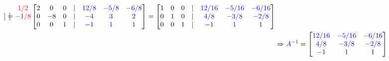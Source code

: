 \documentclass[reqno]{amsart}
\theoremstyle{definition}
\begin{document}
\begin{align*}
\begin{bmatrix}
\end{bmatrix} = \begin{matrix}
{\color{red}1/2}\\
{\color{red}-1/8}\\
\\
\end{matrix}\begin{bmatrix}
2 & 0 & 0 & | & {\color{blue}12/8} & {\color{blue}-5/8} & {\color{blue}-6/8}\\
0 & -8 & 0 & | & {\color{blue}-4} & {\color{blue}3} & {\color{blue}2}\\
0 & 0 & 1 & | & {\color{blue}-1} & {\color{blue}1} & {\color{blue}1}
\end{bmatrix} = \begin{bmatrix}
1 & 0 & 0 & | & {\color{blue}12/16} & {\color{blue}-5/16} & {\color{blue}-6/16}\\
0 & 1 & 0 & | & {\color{blue}4/8} & {\color{blue}-3/8} & {\color{blue}-2/8}\\
0 & 0 & 1 & | & {\color{blue}-1} & {\color{blue}1} & {\color{blue}1}
\end{bmatrix}\\
&\Rightarrow {\color{blue}A^{-1}} = \begin{bmatrix}
{\color{blue}12/16} & {\color{blue}-5/16} & {\color{blue}-6/16}\\
{\color{blue}4/8} & {\color{blue}-3/8} & {\color{blue}-2/8}\\
{\color{blue}-1} & {\color{blue}1} & {\color{blue}1}
\end{bmatrix}
\end{align*}
\end{document}
